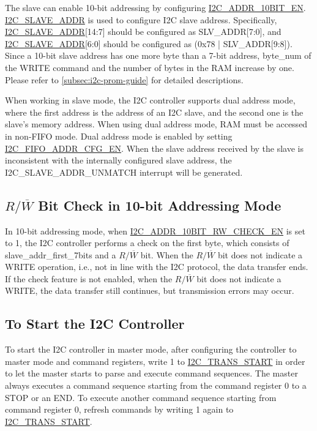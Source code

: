 \documentclass[main\_\_EN.tex]{subfiles}
\begin{document}
The slave can enable 10-bit addressing by configuring \hyperref[fielddesc:I2CADDR10BITEN]{I2C\_ADDR\_10BIT\_EN}. \hyperref[fielddesc:I2CSLAVEADDR]{I2C\_SLAVE\_ADDR} is used to configure I2C slave address. Specifically, \hyperref[fielddesc:I2CSLAVEADDR]{I2C\_SLAVE\_ADDR}[14:7] should be configured as SLV\_ADDR[7:0], and  \hyperref[fielddesc:I2CSLAVEADDR]{I2C\_SLAVE\_ADDR}[6:0] should be configured as (0x78 | SLV\_ADDR[9:8]). Since a 10-bit slave address has one more byte than a 7-bit address, byte\_num of the WRITE command and the number of bytes in the RAM increase by one. Please refer to \ref{subsec:i2c-prom-guide} for detailed descriptions.

When working in slave mode, the I2C controller supports dual address mode, where the first address is the address of an I2C slave, and the second one is the slave's memory address. When using dual address mode, RAM must be accessed in non-FIFO mode. 
Dual address mode is enabled by setting \hyperref[fielddesc:I2CFIFOADDRCFGEN]{I2C\_FIFO\_ADDR\_CFG\_EN}. When the slave address received by the slave is inconsistent with the internally configured slave address, the I2C\_SLAVE\_ADDR\_UNMATCH interrupt will be generated. 

\subsection{\texorpdfstring{$R/\overline W$ Bit Check in 10-bit Addressing Mode}{R/W Bit Check in 10-bit Addressing Mode}}
In 10-bit addressing mode, when \hyperref[fielddesc:I2CADDR10BITRWCHECKEN]{I2C\_ADDR\_10BIT\_RW\_CHECK\_EN} is set to 1, the I2C controller performs a check on the first byte, which consists of slave\_addr\_first\_7bits and a $R/\overline W$ bit. When the $R/\overline W$ bit does not indicate a WRITE operation, i.e., not in line with the I2C protocol, the data transfer ends. If the check feature is not enabled, when the $R/\overline W$ bit does not indicate a WRITE, the data transfer still continues, but transmission errors may occur.

\subsection{To Start the I2C Controller}\label{subsubsec:i2c-start}
To start the I2C controller in master mode, after configuring the controller to master mode and command registers, write 1 to \hyperref[fielddesc:I2CTRANSSTART]{I2C\_TRANS\_START} in order to let the master starts to parse and execute command sequences. The master always executes a command sequence starting from the command register 0 to a STOP or an END. To execute another command sequence starting from command register 0, refresh commands by writing 1 again to \hyperref[fielddesc:I2CTRANSSTART]{I2C\_TRANS\_START}.
\end{document}
